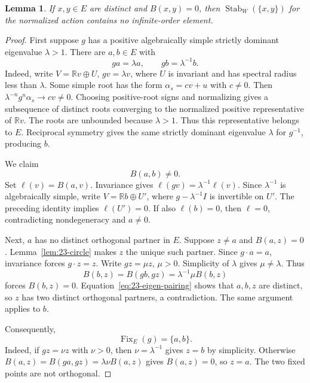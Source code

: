 \documentclass[11pt,reqno]{amsart}
\newcommand{\R}{\mathbb{R}}
\theoremstyle{plain}
\newtheorem{lemma}[theorem]{Lemma}
\theoremstyle{definition}
\theoremstyle{remark}
\numberwithin{equation}{section}
\begin{document}
\begin{lemma}\label{lem:23-pair-stabilizer}
If $x,y\in E$ are distinct and $B(x,y)=0$, then $\operatorname{Stab}_W(\{x,y\})$ for the normalized action contains no infinite-order element.
\end{lemma}
\begin{proof}
First suppose $g$ has a positive algebraically simple strictly dominant eigenvalue $\lambda>1$. There are $a,b\in E$ with
\begin{equation}\label{eq:23-eigenvectors}
ga=\lambda a,\qquad gb=\lambda^{-1}b.
\end{equation}
Indeed, write $V=\R v\oplus U$, $gv=\lambda v$, where $U$ is invariant and has spectral radius less than $\lambda$. Some simple root has the form $\alpha_s=cv+u$ with $c\neq0$. Then $\lambda^{-n}g^n\alpha_s\to cv\neq0$. Choosing positive-root signs and normalizing gives a subsequence of distinct roots converging to the normalized positive representative of $\R v$. The roots are unbounded because $\lambda>1$. Thus this representative belongs to $E$. Reciprocal symmetry gives the same strictly dominant eigenvalue $\lambda$ for $g^{-1}$, producing $b$.

We claim
\begin{equation}\label{eq:23-eigen-pairing}
B(a,b)\neq0.
\end{equation}
Set $\ell(v)=B(a,v)$. Invariance gives $\ell(gv)=\lambda^{-1}\ell(v)$. Since $\lambda^{-1}$ is algebraically simple, write $V=\R b\oplus U'$, where $g-\lambda^{-1}I$ is invertible on $U'$. The preceding identity implies $\ell(U')=0$. If also $\ell(b)=0$, then $\ell=0$, contradicting nondegeneracy and $a\neq0$.

Next, $a$ has no distinct orthogonal partner in $E$. Suppose $z\neq a$ and $B(a,z)=0$. Lemma~\ref{lem:23-circle} makes $z$ the unique such partner. Since $g\cdot a=a$, invariance forces $g\cdot z=z$. Write $gz=\mu z$, $\mu>0$. Simplicity of $\lambda$ gives $\mu\neq\lambda$. Thus
\[
B(b,z)=B(gb,gz)=\lambda^{-1}\mu B(b,z)
\]
forces $B(b,z)=0$. Equation~\eqref{eq:23-eigen-pairing} shows that $a,b,z$ are distinct, so $z$ has two distinct orthogonal partners, a contradiction. The same argument applies to $b$.

Consequently,
\begin{equation}\label{eq:23-fixed-points}
\operatorname{Fix}_E(g)=\{a,b\}.
\end{equation}
Indeed, if $gz=\nu z$ with $\nu>0$, then $\nu=\lambda^{-1}$ gives $z=b$ by simplicity. Otherwise $B(a,z)=B(ga,gz)=\lambda\nu B(a,z)$ gives $B(a,z)=0$, so $z=a$. The two fixed points are not orthogonal.


\end{proof}
\end{document}
